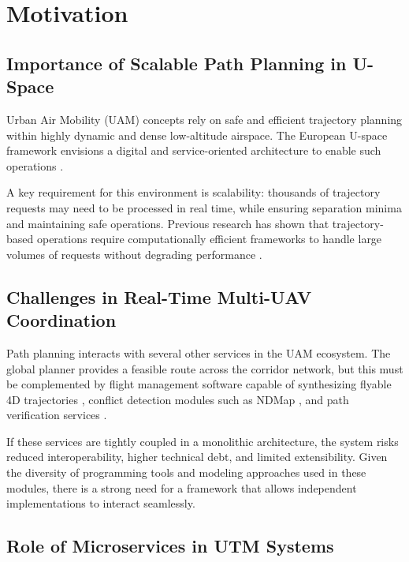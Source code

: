 \chapter{Motivation}%
\label{s_motivation}

\section{Importance of Scalable Path Planning in U-Space}%
\label{s_motivation}

Urban Air Mobility (UAM) concepts rely on safe and efficient trajectory planning 
within highly dynamic and dense low-altitude airspace. The European U-space 
framework envisions a digital and service-oriented architecture to enable such 
operations \cite{eu_commission_2017}. 

A key requirement for this environment is scalability: thousands of trajectory 
requests may need to be processed in real time, while ensuring separation 
minima and maintaining safe operations. Previous research has shown that 
trajectory-based operations require computationally efficient frameworks to 
handle large volumes of requests without degrading performance 
\cite{kopardekar2016utm, sesar_conops_2019}. 

\section{Challenges in Real-Time Multi-UAV Coordination}%
\label{s_contribution}

Path planning interacts with several other services in the UAM ecosystem. 
The global planner provides a feasible route across the corridor network, 
but this must be complemented by flight management software capable of 
synthesizing flyable 4D trajectories \cite{morscheck2021cfms}, conflict 
detection modules such as NDMap \cite{NDMap}, and path verification 
services \cite{sesar_conops_2019}. 

If these services are tightly coupled in a monolithic architecture, the system 
risks reduced interoperability, higher technical debt, and limited extensibility. 
Given the diversity of programming tools and modeling approaches used in these 
modules, there is a strong need for a framework that allows independent 
implementations to interact seamlessly.

\section{Role of Microservices in UTM Systems}%
\label{s_structure}

